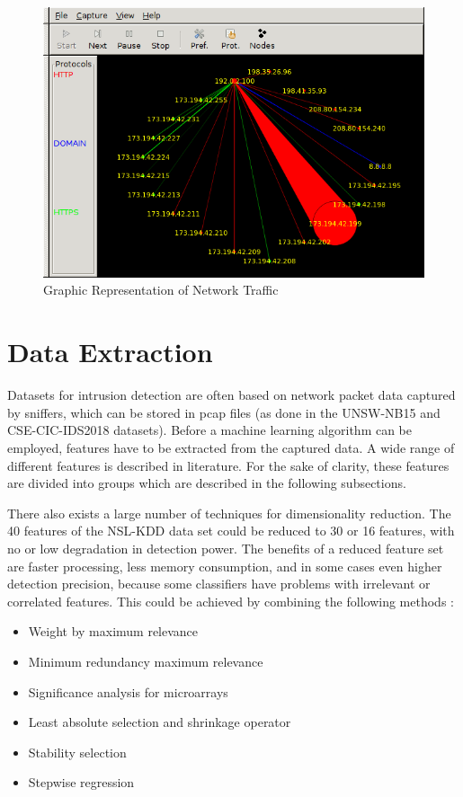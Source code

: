 \documentclass[conference]{IEEEtran}
\begin{document}
\begin{figure}[htbp]
\centerline{\includegraphics[scale=0.37]{etherape.png}}
\caption{Graphic Representation of Network Traffic}
\label{etherape}
\end{figure}

\section{Data Extraction}

Datasets for intrusion detection are often based on network packet data captured by sniffers, which can be stored in pcap files (as done in the UNSW-NB15 \cite{Nb2015} and CSE-CIC-IDS2018 \cite{Ids2018} datasets). Before a machine learning algorithm can be employed, features have to be extracted from the captured data. A wide range of different features is described in literature. For the sake of clarity, these features are divided into groups which are described in the following subsections.

There also exists a large number of techniques for dimensionality reduction. The 40 features of the NSL-KDD data set could be reduced to 30 or 16 features, with no or low degradation in detection power. The benefits of a reduced feature set are faster processing, less memory consumption, and in some cases even higher detection precision, because some classifiers have problems with irrelevant or correlated features. This could be achieved by combining the following methods \cite{vasquez2015}:
\begin{itemize}
	\item Weight by maximum relevance
	\item Minimum redundancy maximum relevance
	\item Significance analysis for microarrays
	\item Least absolute selection and shrinkage operator
	\item Stability selection
	\item Stepwise regression
\end{itemize}
\end{document}
